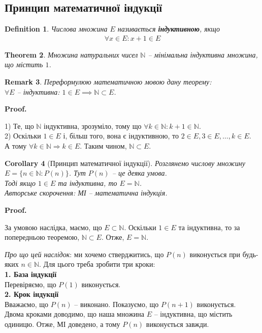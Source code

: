 \documentclass[a4paper, 14pt]{article}
\makeatletter
\def\qed{$\blacksquare$}
\theoremstyle{theoremdd}
\newtheorem{theorem}{Theorem}[subsection]
\theoremstyle{theoremdd}
\newtheorem{definition}[theorem]{Definition}
\theoremstyle{theoremdd}
\theoremstyle{theoremdd}
\theoremstyle{theoremdd}
\theoremstyle{theoremdd}
\newtheorem{remark}[theorem]{Remark}
\theoremstyle{theoremdd}
\theoremstyle{theoremdd}
\newtheorem{corollary}[theorem]{Corollary}
\renewenvironment{proof}[1][Proof.\\]{\par
\pushQED{\hfill \qed}%
\normalfont \topsep6\p@\@plus6\p@\relax
\trivlist
\item\relax
{\bfseries
#1\@addpunct{.}}\hspace\labelsep\ignorespaces
}{%
\popQED\endtrivlist\@endpefalse
}
\makeatother
\begin{document}
	\subsection*{Принцип математичної індукції}
	\begin{definition}
	Числова множина $E$ називається \textbf{індуктивною}, якщо
	\begin{align*}
		\forall x \in E: x+1 \in E
	\end{align*}
	\end{definition}
	
	\begin{theorem}
	Множина натуральних чисел $\mathbb{N}$ -- мінімальна індуктивна множина, що містить $1$.
	\end{theorem}
	
	\begin{remark}
	Переформулюю математичною мовою дану теорему:\\
	$\forall E$ -- індуктивна: $1 \in E \implies \mathbb{N} \subset E$.
	\end{remark}
	
	\begin{proof}
	1) Те, що $\mathbb{N}$ індуктивна, зрозуміло, тому що $\forall k \in \mathbb{N}: k+1 \in \mathbb{N}$.\\
	2) Оскільки $1 \in E$ і, більш того, вона є індуктивною, то $2 \in E, 3 \in E, \dots, k \in E$.\\
	А тому $\forall k \in \mathbb{N} \Rightarrow k \in E$. Таким чином, $\mathbb{N} \subset E$.
	\end{proof}
	
	\begin{corollary}[Принцип математичної індукції]
	Розглянемо числову множину $E = \{n \in \mathbb{N}: P(n)\}$. Тут $P(n)$ -- це деяка умова.\\
	Тоді якщо $1 \in E$ та індуктивна, то $E = \mathbb{N}$.\\
	Авторське скорочення: МІ -- математична індукція.
	\end{corollary}
	
	\begin{proof}
	За умовою наслідка, маємо, що $E \subset \mathbb{N}$. Оскільки $1 \in E$ та індуктивна, то за попередньою теоремою, $\mathbb{N} \subset E$. Отже, $E = \mathbb{N}$.
	\end{proof}
	
	\textit{Про що цей наслідок}: ми хочемо стверджитись, що $P(n)$ виконується при будь-яких $n \in \mathbb{N}$. Для цього треба зробити три кроки:\\
	\textbf{1. База індукції}\\
	Перевіряємо, що $P(1)$ виконується.
	\bigskip \\
	\textbf{2. Крок індукції}\\
	Вважаємо, що $P(n)$ -- виконано. Показуємо, що $P(n+1)$ виконується.
	\bigskip \\
	Двома кроками доводимо, що наша множина $E$ -- індуктивна, що містить одиницю. Отже, МІ доведено, а тому $P(n)$ виконується завжди.
	
\end{document}

